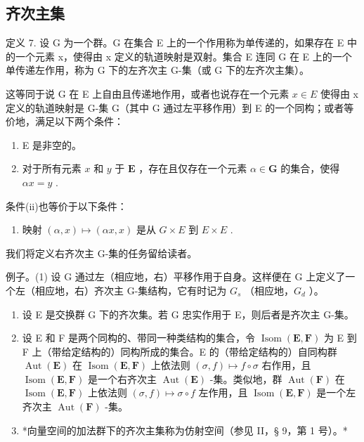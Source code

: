 \subsection{齐次主集}

定义 7. 设 G 为一个群。G 在集合 E 上的一个作用称为单传递的，如果存在 E 中的一个元素 x，使得由 x 定义的轨道映射是双射。集合 E 连同 G 在 E 上的一个单传递左作用，称为 G 下的左齐次主 G-集（或 G 下的左齐次主集）。

这等同于说 G 在 E 上自由且传递地作用，或者也说存在一个元素 \(x \in E\) 使得由 x 定义的轨道映射是 G-集 G（其中 G 通过左平移作用）到 E 的一个同构；或者等价地，满足以下两个条件：

\begin{enumerate}
\def\labelenumi{(\roman{enumi})}
\item
  E 是非空的。
\item
  对于所有元素 \(x\) 和 \(y\) 于 \(\mathbf{E}\) ，存在且仅存在一个元素 \(\alpha \in \mathbf{G}\) 的集合，使得 \(\alpha x = y\) .
\end{enumerate}

条件(ii)也等价于以下条件：

\begin{enumerate}
\def\labelenumi{(\roman{enumi})}
\setcounter{enumi}{2}
\tightlist
\item
  映射 \((\alpha, x) \mapsto (\alpha x, x)\) 是从 \(G \times E\) 到 \(E \times E\) .
\end{enumerate}

我们将定义右齐次主 G-集的任务留给读者。

例子。(1) 设 G 通过左（相应地，右）平移作用于自身。这样便在 G 上定义了一个左（相应地，右）齐次主 G-集结构，它有时记为 \(G_{s}\) （相应地，\(G_{d}\) ）。

\begin{enumerate}
\def\labelenumi{(\arabic{enumi})}
\setcounter{enumi}{1}
\item
  设 E 是交换群 G 下的齐次集。若 G 忠实作用于 E，则后者是齐次主 G-集。
\item
  设 E 和 F 是两个同构的、带同一种类结构的集合，令 \(\operatorname{Isom}(\mathbf{E}, \mathbf{F})\) 为 E 到 F 上（带给定结构的）同构所成的集合。E 的（带给定结构的）自同构群 \(\operatorname{Aut}(\mathbf{E})\) 在 \(\operatorname{Isom}(\mathbf{E}, \mathbf{F})\) 上依法则 \((\sigma, f) \mapsto f \circ \sigma\) 右作用，且 \(\operatorname{Isom}(\mathbf{E}, \mathbf{F})\) 是一个右齐次主 \(\operatorname{Aut}(\mathbf{E})\) -集。类似地，群 \(\operatorname{Aut}(\mathbf{F})\) 在 \(\operatorname{Isom}(\mathbf{E}, \mathbf{F})\) 上依法则 \((\sigma, f) \mapsto \sigma \circ f\) 左作用，且 \(\operatorname{Isom}(\mathbf{E}, \mathbf{F})\) 是一个左齐次主 \(\operatorname{Aut}(\mathbf{F})\) -集。
\item
  *向量空间的加法群下的齐次主集称为仿射空间（参见 II，§ 9，第 1 号）。*
\end{enumerate}

